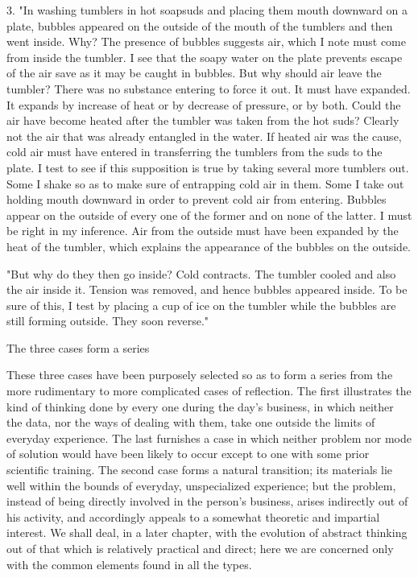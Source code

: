 \documentclass[letterpaper]{book}
\begin{document}
3. "In washing tumblers in hot soapsuds and placing them mouth downward
on a plate, bubbles appeared on the outside of the mouth of the tumblers
and then went inside. Why? The presence of bubbles suggests air, which I
note must come from inside the tumbler. I see that the soapy water on
the plate prevents escape of the air save as it may be caught in
bubbles. But why should air leave the tumbler? There was no substance
entering to force it out. It must have expanded. It expands by increase
of heat or by decrease of pressure, or by both. Could the air have
become heated after the tumbler was taken from the hot suds? Clearly not
the air that was already
entangled
in the water. If heated air was the cause, cold air must have entered in
transferring the tumblers from the suds to the plate. I test to see if
this supposition is true by taking several more tumblers out. Some I
shake so as to make sure of entrapping cold air in them. Some I take out
holding mouth downward in order to prevent cold air from entering.
Bubbles appear on the outside of every one of the former and on none of
the latter. I must be right in my inference. Air from the outside must
have been expanded by the heat of the tumbler, which explains the
appearance of the bubbles on the outside.

"But why do they then go inside? Cold contracts. The tumbler cooled and
also the air inside it. Tension was removed, and hence bubbles appeared
inside. To be sure of this, I test by placing a cup of ice on the
tumbler while the bubbles are still forming outside. They soon reverse."

The three cases form a series

These three cases have been purposely selected so as to form a series
from the more rudimentary to more complicated cases of reflection. The
first illustrates the kind of thinking done by every one during the
day's business, in which neither the data, nor the ways of dealing with
them, take one outside the limits of everyday experience. The last
furnishes a case in which neither problem nor mode of solution would
have been likely to occur except to one with some prior scientific
training. The second case forms a natural transition; its materials lie
well within the bounds of everyday, unspecialized experience; but the
problem, instead of being directly involved in the person's business,
arises indirectly out of his activity, and accordingly appeals to a
somewhat theoretic and impartial interest.
We
shall deal, in a later chapter, with the evolution of abstract thinking
out of that which is relatively practical and direct; here we are
concerned only with the common elements found in all the types.
\end{document}
